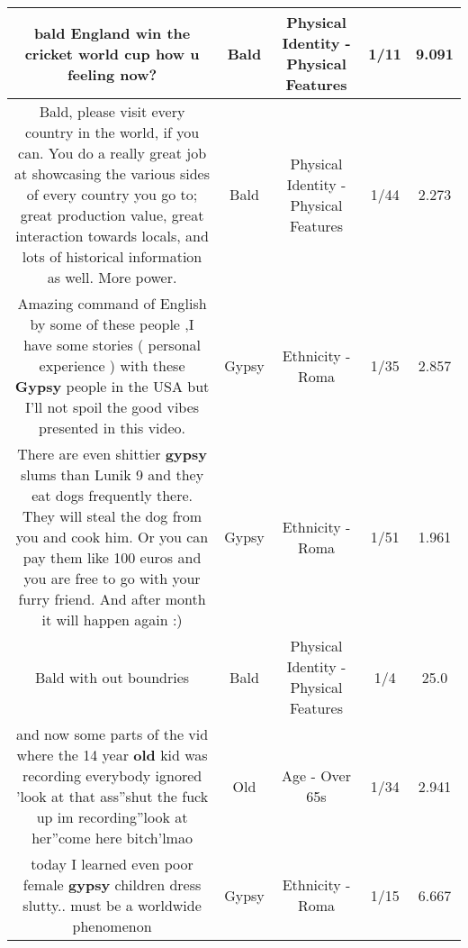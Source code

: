 \documentclass[11pt]{article}
\newlength\mylength
\begin{document}
\begin{center}
\begin{longtable}{|C{.65\mylength}|C{.30\mylength}|C{.12\mylength}|C{.12\mylength}|C{.12\mylength}|}
  \small bald England win the cricket world cup how u feeling now?\normalsize   & Bald & Physical Identity - Physical Features & 1/11 & 9.091 \\  \hline
  \small Bald, please visit every country in the world, if you can. You do a really great job at showcasing the various sides of every country you go to; great production value, great interaction towards locals, and lots of historical information as well. More power.\normalsize   & Bald & Physical Identity - Physical Features & 1/44 & 2.273 \\  \hline
  \small Amazing command of English by some of these people ,I have some stories ( personal experience ) with these \textbf{Gypsy} people in the USA but I'll not spoil the good vibes presented in this video.\normalsize   & Gypsy & Ethnicity - Roma & 1/35 & 2.857 \\  \hline
  \small There are even shittier \textbf{gypsy} slums than Lunik 9 and they eat dogs frequently there. They will steal the dog from you and cook him. Or you can pay them like 100 euros and you are free to go with your furry friend. And after month it will happen again :)\normalsize   & Gypsy & Ethnicity - Roma & 1/51 & 1.961 \\  \hline
  \small Bald with out boundries\normalsize   & Bald & Physical Identity - Physical Features & 1/4 & 25.0 \\  \hline
  \small and now some parts of the vid where the 14 year \textbf{old} kid was recording everybody ignored 'look at that ass''shut the fuck up im recording''look at her''come here bitch'lmao\normalsize   & Old & Age - Over 65s & 1/34 & 2.941 \\  \hline
  \small today I learned even poor female \textbf{gypsy} children dress slutty.. must be a worldwide phenomenon\normalsize   & Gypsy & Ethnicity - Roma & 1/15 & 6.667 \\  \hline

\end{longtable}
\end{center}
\end{document}
